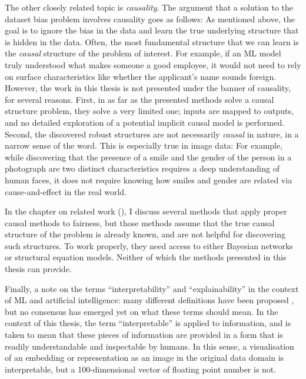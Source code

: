 The other closely related topic is \emph{causality}.
The argument that a solution to the dataset bias problem involves causality goes as follows:
As mentioned above, the goal is to ignore the bias in the data
and learn the true underlying structure that is hidden in the data.
Often, the most fundamental structure that we can learn is the \emph{causal} structure of the problem of interest.
For example, if an \acs{ML} model truly understood what makes someone a good employee,
it would not need to rely on surface characteristics like whether the applicant's name sounds foreign.
However, the work in this thesis is not presented under the banner of causality, for several reasons.
First, in as far as the presented methods solve a causal structure problem, they solve a very limited one;
inputs are mapped to outputs, and no detailed exploration of a potential implicit causal model is performed.
Second, the discovered robust structures are not necessarily \emph{causal} in nature, in a narrow sense of the word.
This is especially true in image data:
For example, while discovering that the presence of a smile and the gender of the person in a photograph are two distinct characteristics
requires a deep understanding of human faces,
it does not require knowing how smiles and gender are related via cause-and-effect in the real world.

In the chapter on related work (),
I discuss several methods that apply proper causal methods to fairness,
but those methods assume that the true causal structure of the problem is already known,
and are not helpful for discovering such structures.
To work properly, they need access to either Bayesian networks or structural equation models.
Neither of which the methods presented in this thesis can provide.

Finally, a note on the terms ``interpretability'' and ``explainability'' in the context of \ac{ML} and artificial intelligence:
many different definitions have been proposed \citep{barredoarrieta2020xai},
but no consensus has emerged yet on what these terms should mean.
In the context of this thesis, the term ``interpretable'' is applied to information,
and is taken to mean that these pieces of information are provided in a form that is readily understandable and inspectable by humans.
In this sense, a visualisation of an embedding or representation as an image in the original data domain
is interpretable,
but a 100-dimensional vector of floating point number is not.

